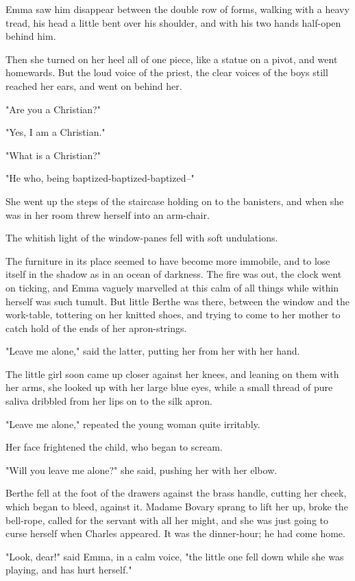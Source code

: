 \documentclass{tufte-book}
\begin{document}
Emma saw him disappear between the double row of forms, walking with a
heavy tread, his head a little bent over his shoulder, and with his two
hands half-open behind him.

Then she turned on her heel all of one piece, like a statue on a pivot,
and went homewards. But the loud voice of the priest, the clear voices
of the boys still reached her ears, and went on behind her.

"Are you a Christian?"

"Yes, I am a Christian."

"What is a Christian?"

"He who, being baptized-baptized-baptized--"

She went up the steps of the staircase holding on to the banisters, and
when she was in her room threw herself into an arm-chair.

The whitish light of the window-panes fell with soft undulations.

The furniture in its place seemed to have become more immobile, and to
lose itself in the shadow as in an ocean of darkness. The fire was out,
the clock went on ticking, and Emma vaguely marvelled at this calm of
all things while within herself was such tumult. But little Berthe was
there, between the window and the work-table, tottering on her knitted
shoes, and trying to come to her mother to catch hold of the ends of her
apron-strings.

"Leave me alone," said the latter, putting her from her with her hand.

The little girl soon came up closer against her knees, and leaning on
them with her arms, she looked up with her large blue eyes, while a
small thread of pure saliva dribbled from her lips on to the silk apron.

"Leave me alone," repeated the young woman quite irritably.

Her face frightened the child, who began to scream.

"Will you leave me alone?" she said, pushing her with her elbow.

Berthe fell at the foot of the drawers against the brass handle, cutting
her cheek, which began to bleed, against it. Madame Bovary sprang to
lift her up, broke the bell-rope, called for the servant with all her
might, and she was just going to curse herself when Charles appeared. It
was the dinner-hour; he had come home.

"Look, dear!" said Emma, in a calm voice, "the little one fell down
while she was playing, and has hurt herself."
\end{document}
